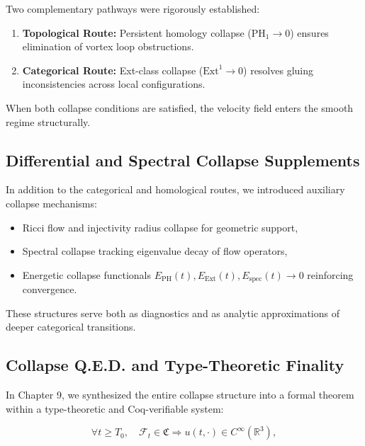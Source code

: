 \documentclass[11pt]{article}
\begin{document}
Two complementary pathways were rigorously established:

\begin{enumerate}
  \item \textbf{Topological Route:} 
  Persistent homology collapse (\( \mathrm{PH}_1 \to 0 \)) ensures elimination of vortex loop obstructions.

  \item \textbf{Categorical Route:}
  Ext-class collapse (\( \mathrm{Ext}^1 \to 0 \)) resolves gluing inconsistencies across local configurations.
\end{enumerate}

When both collapse conditions are satisfied, the velocity field enters the smooth regime structurally.

\subsection{Differential and Spectral Collapse Supplements}

In addition to the categorical and homological routes, we introduced auxiliary collapse mechanisms:

\begin{itemize}
  \item Ricci flow and injectivity radius collapse for geometric support,
  \item Spectral collapse tracking eigenvalue decay of flow operators,
  \item Energetic collapse functionals \( E_{\mathrm{PH}}(t), E_{\mathrm{Ext}}(t), E_{\mathrm{spec}}(t) \to 0 \) reinforcing convergence.
\end{itemize}

These structures serve both as diagnostics and as analytic approximations of deeper categorical transitions.

\subsection{Collapse Q.E.D. and Type-Theoretic Finality}

In Chapter 9, we synthesized the entire collapse structure into a formal theorem within a type-theoretic and Coq-verifiable system:

\begin{equation}
\forall t \geq T_0,\quad \mathcal{F}_t \in \mathfrak{C} \Rightarrow u(t, \cdot) \in C^\infty(\mathbb{R}^3),
\end{equation}
\end{document}
